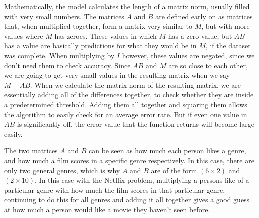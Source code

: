 Mathematically, the model calculates the length of a matrix norm, usually filled with very small numbers. The matrices $A$ and $B$ are defined early on as matrices that, when multiplied together, form a matrix very similar to $M$, but with more values where $M$ has zeroes. These values in which $M$ has a zero value, but $AB$ has a value are basically predictions for what they would be in $M$, if the dataset was complete. When multiplying by $I$ however, these values are negated, since we don't need them to check accuracy. Since $AB$ and $M$ are so close to each other, we are going to get very small values in the resulting matrix when we say $M-AB$. When we calculate the matrix norm of the resulting matrix, we are essentially adding all of the differences together, to check whether they are inside a predetermined threshold. Adding them all together and squaring them allows the algorithm to easily check for an average error rate. But if even one value in $AB$ is significantly off, the error value that the function returns will become large easily.

The two matrices $A$ and $B$ can be seen as how much each person likes a genre, and how much a film scores in a specific genre respectively. In this case, there are only two general genres, which is why $A$ and $B$ are of the form $(6\times 2)$ and $(2\times 10)$. In this case with the Netflix problem, multiplying a persons like of a particular genre with how much the film scores in that particular genre, continuing to do this for all genres and adding it all together gives a good guess at how much a person would like a movie they haven't seen before.